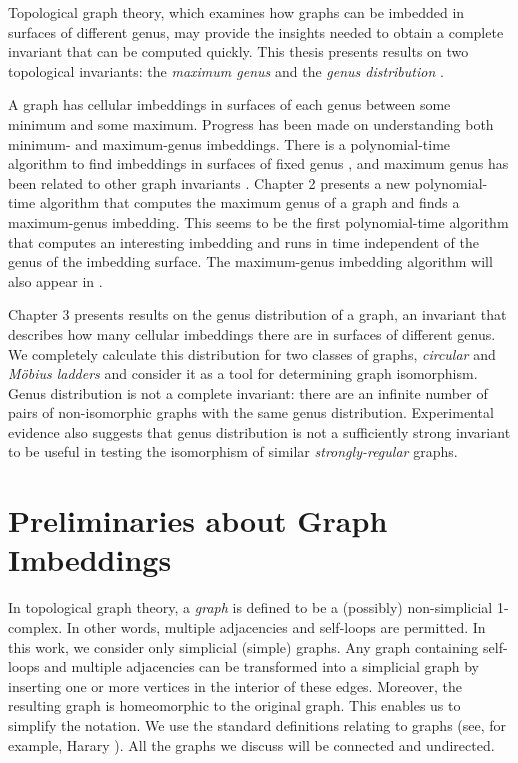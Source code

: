 \documentclass [11pt] {report}
\def\sl{\it}
\begin{document}
Topological graph theory, which examines how graphs can be
imbedded in surfaces of different genus, may
provide the insights needed to obtain a complete invariant that can be
computed quickly.  This thesis presents results on two topological
invariants:  the {\sl maximum genus} and the {\sl genus distribution
}.

A graph has cellular imbeddings in surfaces of each genus between some
minimum and some maximum.  Progress has been made on understanding both
minimum- and maximum-genus imbeddings.  There is a polynomial-time algorithm
to find imbeddings in surfaces of fixed genus \cite{fmr}, and maximum genus
has been related to other graph invariants \cite{xuong79a}.  Chapter
2 presents a new polynomial-time algorithm that computes the
maximum genus of a graph and finds a maximum-genus imbedding.  This seems to
be the first polynomial-time algorithm that computes an interesting
imbedding and runs in time independent of the genus of the imbedding
surface.  The maximum-genus imbedding algorithm will also appear in
\cite{fgm}.

Chapter 3 presents results on the genus distribution of a graph,
an invariant that describes how many cellular imbeddings there are in
surfaces of different genus.  We completely calculate this distribution for
two classes of graphs, {\sl circular} and {\sl M\"obius ladders} and
consider it as a tool for determining graph isomorphism.  Genus distribution
is not a complete invariant: there are an infinite number of pairs of
non-isomorphic graphs with the same genus distribution. Experimental
evidence also suggests that genus distribution is not a sufficiently strong
invariant to be useful in testing the isomorphism of similar {\sl
strongly-regular} graphs.

\section{Preliminaries about Graph Imbeddings}

In topological graph theory, a {\sl graph} is defined to be a (possibly)
non-simplicial 1-complex.  In other words, multiple adjacencies and
self-loops are permitted.  In this work, we consider only simplicial
(simple) graphs.  Any graph containing self-loops and multiple adjacencies
can be transformed into a simplicial graph by inserting one or more vertices
in the interior of these edges.  Moreover, the resulting graph is
homeomorphic to the original graph.  This enables us to simplify the
notation.  We use the standard definitions relating to graphs (see, for
example, Harary \cite{harary}).  All the graphs we discuss will be connected
and undirected.
\end{document}
